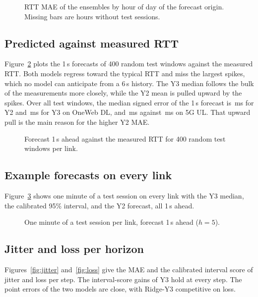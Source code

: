 \begin{figure}[h]
  \centering
  \resizebox{\linewidth}{!}{}
  \caption{RTT MAE of the ensembles by hour of day of the forecast origin. Missing bars are hours without test sessions.}
  \label{fig:hour}
\end{figure}

\subsection{Predicted against measured RTT}
Figure~\ref{fig:scatter} plots the 1\,s forecasts of 400 random test windows against the measured RTT. Both models regress toward the typical RTT and miss the largest spikes, which no model can anticipate from a 6\,s history. The Y3 median follows the bulk of the measurements more closely, while the Y2 mean is pulled upward by the spikes. Over all test windows, the median signed error of the 1\,s forecast is \BiasYtwoOWDL\,ms for Y2 and \BiasYthreeOWDL\,ms for Y3 on OneWeb DL, and \BiasYtwoQUL\,ms against \BiasYthreeQUL\,ms on 5G UL. That upward pull is the main reason for the higher Y2 MAE.

\begin{figure}[h]
  \centering
  \resizebox{\linewidth}{!}{}
  \caption{Forecast 1\,s ahead against the measured RTT for 400 random test windows per link.}
  \label{fig:scatter}
\end{figure}

\subsection{Example forecasts on every link}
Figure~\ref{fig:traces} shows one minute of a test session on every link with the Y3 median, the calibrated 95\% interval, and the Y2 forecast, all 1\,s ahead.

\begin{figure}[p]
  \centering
  \resizebox{\linewidth}{!}{}
  \caption{One minute of a test session per link, forecast 1\,s ahead ($h=5$).}
  \label{fig:traces}
\end{figure}

\subsection{Jitter and loss per horizon}
Figures~\ref{fig:jitter} and~\ref{fig:loss} give the MAE and the calibrated interval score of jitter and loss per step. The interval-score gains of Y3 hold at every step. The point errors of the two models are close, with Ridge-Y3 competitive on loss.

